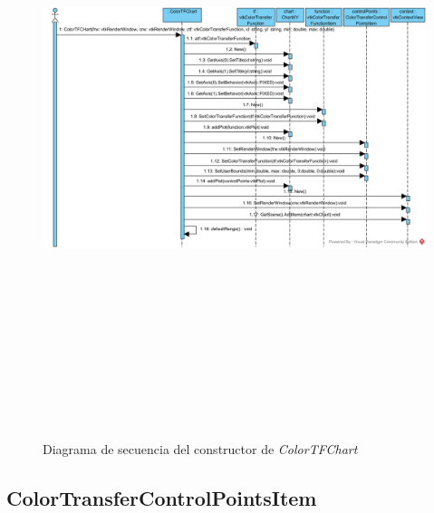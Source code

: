 \begin{figure}[H]
	\centering
	\includegraphics[angle=90,height=18cm]{imagenes/diagramas/secuencia/ColorTFChart_New}
	\caption{Diagrama de secuencia del constructor de \textit{ColorTFChart}}
	\label{fig:diagrama_secuencia_colortfchart_new}
\end{figure}

\subsection{ColorTransferControlPointsItem}

